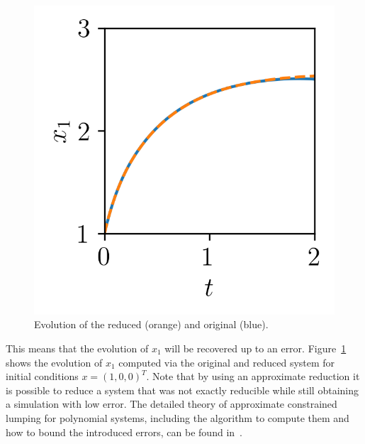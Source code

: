 \begin{figure}
	\centering
	\vspace{-0.5cm}
	\includegraphics[width=0.9\linewidth]{./img/sim_red_example.png}
	\caption{Evolution of the reduced (orange) and original (blue).}
	\label{fig:apperr:sim}
\end{figure}
This means that the evolution of $x_1$ will be recovered up to an error.
Figure~\ref{fig:apperr:sim} shows the evolution of $x_1$ computed via the original and reduced system for initial conditions $x = (1,0,0)^{T}$.
Note that by using an approximate reduction it is possible to reduce a system that was not exactly reducible while still obtaining a simulation with low error.
The detailed theory of approximate constrained lumping for polynomial systems, including the algorithm to compute them and how to bound the introduced errors, can be found in~\cite{leguizamon-robayo_approximate_2023}.






